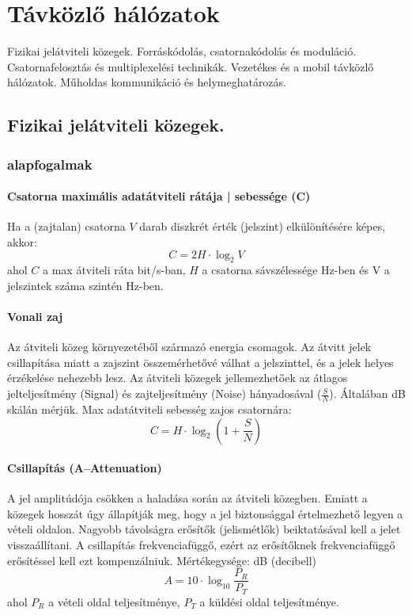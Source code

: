 \section{Távközlő hálózatok}
{\footnotesize Fizikai jelátviteli közegek. Forráskódolás, csatornakódolás és moduláció. Csatornafelosztás és multiplexelési technikák. Vezetékes és a mobil távközlő hálózatok. Műholdas kommunikáció és helymeghatározás.}
\subsection{Fizikai jelátviteli közegek.}

\subsubsection{alapfogalmak}
\paragraph{Csatorna maximális adatátviteli rátája | sebessége (C)} Ha a (zajtalan) csatorna $V$ darab diszkrét érték (jelszint) elkülönítésére képes, akkor:
$$C=2H\cdot \log_{2}V$$
ahol $C$ a max átviteli ráta bit/s-ban, $H$ a csatorna sávszélessége Hz-ben és V a jelszintek száma szintén Hz-ben.

\paragraph{Vonali zaj} Az átviteli közeg környezetéből származó energia csomagok. Az átvitt jelek csillapítása miatt a zajszint összemérhetővé válhat a jelszinttel, és a jelek helyes érzékelése nehezebb lesz. Az átviteli közegek jellemezhetőek az átlagos jelteljesítmény (Signal) és zajteljesítmény (Noise) hányadosával ($\frac{S}{N}$). Általában dB skálán mérjük.
Max adatátviteli sebesség zajos csatornára:
$$ C=H\cdot\log_{2}(1+ \frac{S}{N})$$

\paragraph{Csillapítás (A--Attenuation)} A jel amplitúdója csökken a haladása során az átviteli közegben. Emiatt a közegek hosszát úgy állapítják meg, hogy a jel biztonsággal értelmezhető legyen a vételi oldalon. Nagyobb távolságra erősítők (jelismétlők) beiktatásával kell a jelet visszaállítani. A csillapítás frekvenciafüggő, ezért az erősítőknek frekvenciafüggő erősítéssel kell ezt kompenzálniuk. Mértékegysége: dB (decibell)
$$ A = 10\cdot\log_{10}\frac{P_R}{P_T}$$
ahol $P_R$ a vételi oldal teljesítménye, $P_T$ a küldési oldal teljesítménye.
